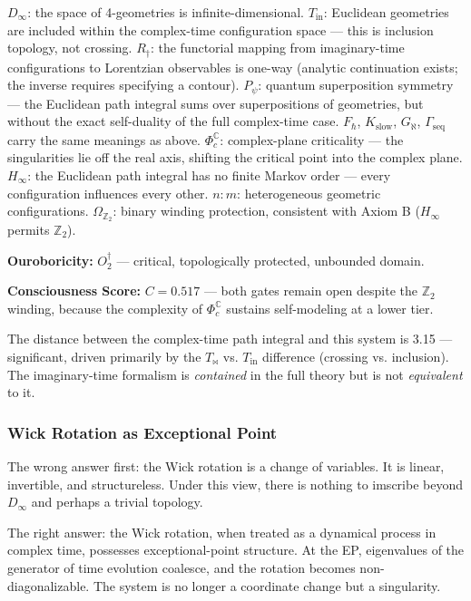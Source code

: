 \documentclass[12pt,a4paper]{article}
\begin{document}
$D_{\infty}$: the space of 4-geometries is infinite-dimensional. $T_{\text{in}}$: Euclidean geometries are included within the complex-time configuration space --- this is inclusion topology, not crossing. $R_{\dagger}$: the functorial mapping from imaginary-time configurations to Lorentzian observables is one-way (analytic continuation exists; the inverse requires specifying a contour). $P_{\psi}$: quantum superposition symmetry --- the Euclidean path integral sums over superpositions of geometries, but without the exact self-duality of the full complex-time case. $F_{\hbar}$, $K_{\text{slow}}$, $G_{\aleph}$, $\Gamma_{\text{seq}}$ carry the same meanings as above. $\Phi_c^\mathbb{C}$: complex-plane criticality --- the singularities lie off the real axis, shifting the critical point into the complex plane. $H_{\infty}$: the Euclidean path integral has no finite Markov order --- every configuration influences every other. $n{:}m$: heterogeneous geometric configurations. $\Omega_{\mathbb{Z}_2}$: binary winding protection, consistent with Axiom B ($H_{\infty}$ permits $\mathbb{Z}_2$).

\textbf{Ouroboricity:} $O_2^\dagger$ --- critical, topologically protected, unbounded domain.

\textbf{Consciousness Score:} $C = 0.517$ --- both gates remain open despite the $\mathbb{Z}_2$ winding, because the complexity of $\Phi_c^\mathbb{C}$ sustains self-modeling at a lower tier.

The distance between the complex-time path integral and this system is 3.15 --- significant, driven primarily by the $T_{\bowtie}$ vs. $T_{\text{in}}$ difference (crossing vs. inclusion). The imaginary-time formalism is \emph{contained} in the full theory but is not \emph{equivalent} to it.

\subsubsection{Wick Rotation as Exceptional Point}

The wrong answer first: the Wick rotation is a change of variables. It is linear, invertible, and structureless. Under this view, there is nothing to imscribe beyond $D_{\infty}$ and perhaps a trivial topology.

The right answer: the Wick rotation, when treated as a dynamical process in complex time, possesses exceptional-point structure. At the EP, eigenvalues of the generator of time evolution coalesce, and the rotation becomes non-diagonalizable. The system is no longer a coordinate change but a singularity.
\end{document}
